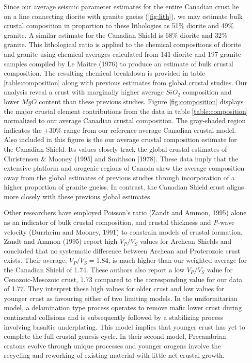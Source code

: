 \documentclass[review]{elsarticle}
\begin{document}
Since our average seismic parameter estimates for the entire Canadian crust lie on a line connecting diorite with granite gneiss (\ref{fig:lith}), we may estimate bulk crustal composition in proportion to these lithologies as 51\% diorite and 49\% granite. A similar estimate for the Canadian Shield is 68\% diorite and 32\% granite. This lithological ratio is applied to the chemical compositions of diorite and granite using chemical averages calculated from 141 diorite and 197 granite samples compiled by Le Maitre (1976) to produce an estimate of bulk crustal composition. The resulting chemical breakdown is provided in table \ref{table:composition} along with previous estimates from global crustal studies. Our analysis reveal a crust with marginally higher average $SiO_2$ composition and lower $MgO$ content than these previous studies. Figure \ref{fig:composition} displays the major crustal element contributions from the data in table \ref{table:composition} normalized to our average Canadian crustal composition. The gray-shaded region indicates the $\pm 30\%$ range from our reference average Canadian crustal model.  Also included in this figure is the our average crustal composition estimate for the Canadian Shield. Its values closely track the global crustal estimates of Christensen \& Mooney (1995] and Smithson [1978). These data imply that the extensive platform and orogenic regions of Canada skew the average composition away from the global estimates of previous studies through incorporation of a higher proportion of granite gneiss. In contrast, the Canadian Shield crust aligns more closely with these previous global estimates.

Other researchers have employed Poisson's ratio (Zandt and Ammon, 1995) alone as an indicator of bulk crustal composition, and crustal thickness and {\it P}-wave velocity (Durrheim and Mooney, 1991) to constrain models of crustal formation. Zandt and Ammon (1995) report high $V_P/V_S$ values for Archean Shields and concluded that no systematic difference between Archean and Proterozoic crust exists. Their average, $V_P/V_S=1.84$, is much higher than our weighted average for the Canadian Shield of 1.74. These authors also report a low $V_P/V_S$ value for Cenozoic-Mesozoic crust, 1.73 compared to the corresponding value for our data of 1.77. They interpret these high values for older crust and low values for younger crust as favouring either of two limiting models. In the uniformitarian model, a delamination type process operates to remove mafic lower crust during continental collisions and is subsequently followed by a stabilizing process involving basaltic underplating. This model implies that younger crust has yet to complete the full crustal genesis cycle. In their second model, Precambrian cratons evolve through unique processes and younger orogens involve the recycling and reworking of existing material with little net crustal growth.
\end{document}
